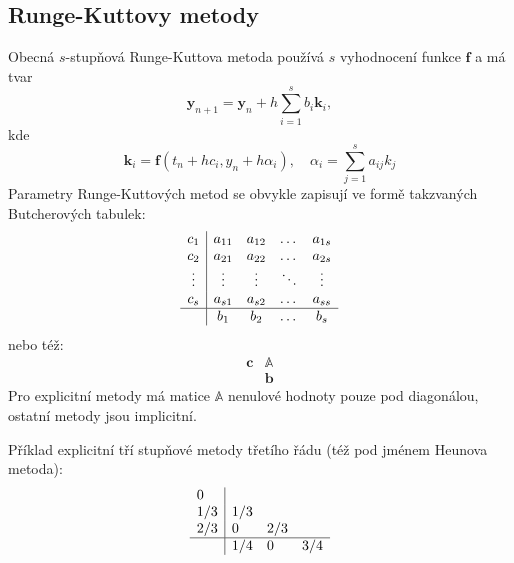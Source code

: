 \documentclass[a4paper, 12pt]{book}
\theoremstyle{definition}
\def\vc#1{\mathbf{\boldsymbol{#1}}}     %
\def\tn#1{{\mathbb{#1}}}    %
\begin{document}
\subsection{Runge-Kuttovy metody}
Obecná $s$-stupňová Runge-Kuttova metoda používá $s$ vyhodnocení funkce $\vc f$ a má tvar
\[
  \vc y_{n+1} = \vc y_n + h\sum_{i=1}^s b_i \vc k_i,
\]
kde 
\[
  \vc k_i = \vc f(t_n+ hc_i, y_n + h\alpha_i),\quad \alpha_i = \sum_{j=1}^s a_{ij} k_j
\]
Parametry Runge-Kuttových metod se obvykle zapisují ve formě takzvaných Butcherových tabulek:
\begin{equation}
    \begin{array}{c|cccc}
        c_1 & a_{11} & a_{12} & \dots & a_{1s} \\
        c_2 & a_{21} & a_{22} & \dots & a_{2s} \\
        \vdots & \vdots & \vdots & \ddots & \vdots \\
        c_s & a_{s1} & a_{s2} & \dots & a_{ss} \\
        \hline
             & b_{1} & b_{2} & \dots & b_{s} \\
    \end{array}
\end{equation}
nebo též:
\begin{equation}
    \begin{array}{c|c}
        \vc c & \tn A\\
              & \vc b 
    \end{array}
\end{equation}
Pro explicitní metody má matice $\tn A$ nenulové hodnoty pouze pod diagonálou, ostatní metody jsou implicitní.

Příklad explicitní tří stupňové metody třetího řádu (též pod jménem Heunova metoda):
\begin{equation}
    \begin{array}{l|lll}
        0 &  &  &  \\
        1/3 & 1/3 &  &  \\
        2/3 & 0 & 2/3 &  \\
        \hline
             & 1/4 & 0 & 3/4 \\
    \end{array}
\end{equation}
\end{document}
